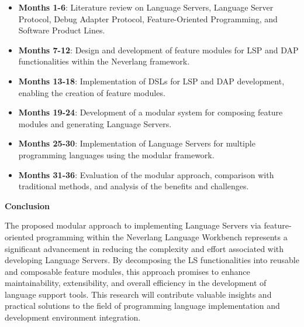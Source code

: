 \begin{itemize}
    \item \textbf{Months 1-6}: Literature review on Language Servers, Language Server Protocol, Debug Adapter Protocol, Feature-Oriented Programming, and Software Product Lines.
    \item \textbf{Months 7-12}: Design and development of feature modules for LSP and DAP functionalities within the Neverlang framework.
    \item \textbf{Months 13-18}: Implementation of DSLs for LSP and DAP development, enabling the creation of feature modules.
    \item \textbf{Months 19-24}: Development of a modular system for composing feature modules and generating Language Servers.
    \item \textbf{Months 25-30}: Implementation of Language Servers for multiple programming languages using the modular framework.
    \item \textbf{Months 31-36}: Evaluation of the modular approach, comparison with traditional methods, and analysis of the benefits and challenges.
\end{itemize}

\hfill \break
\noindent
\textbf{Conclusion}

The proposed modular approach to implementing Language Servers via feature-oriented programming within the Neverlang Language Workbench represents a significant advancement in reducing the complexity and effort associated with developing Language Servers. By decomposing the LS functionalities into reusable and composable feature modules, this approach promises to enhance maintainability, extensibility, and overall efficiency in the development of language support tools. This research will contribute valuable insights and practical solutions to the field of programming language implementation and development environment integration.




